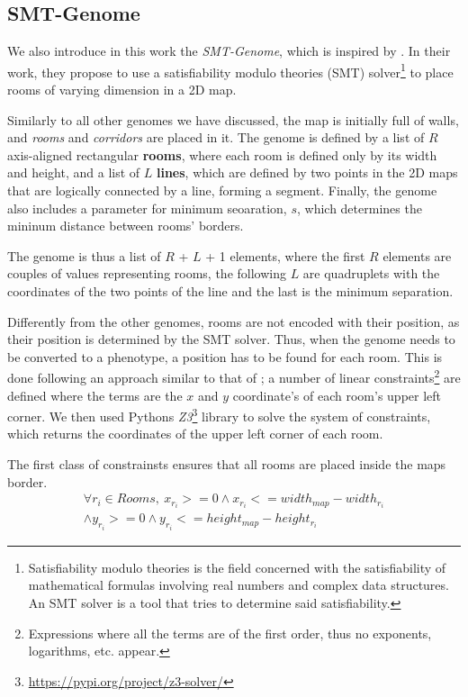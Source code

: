 \documentclass{Configuration_Files/PoliMi3i_thesis}
\begin{document}
\subsection{SMT-Genome}
\label{subsec:smt_genome}

We also introduce in this work the \textit{SMT-Genome}, which is inspired by \citet{whitehead_spatial_2020}. In their work, they propose to use a satisfiability modulo theories (SMT) solver\footnote{Satisfiability modulo theories is the field concerned with the satisfiability of mathematical formulas involving real numbers and complex data structures. An SMT solver is a tool that tries to determine said satisfiability.} to place rooms of varying dimension in a 2D map. 

Similarly to all other genomes we have discussed, the map is initially full of walls, and \textit{rooms} and \textit{corridors} are placed in it.
The genome is defined by a list of $R$ axis-aligned rectangular \textbf{rooms}, where each room is defined only by its width and height, and a list of $L$ \textbf{lines}, which are defined by two points in the 2D maps that are logically connected by a line, forming a segment. Finally, the genome also includes a parameter for minimum seoaration, $s$, which determines the mininum distance between rooms' borders. 

The genome is thus a list of $R$ + $L$ + 1 elements, where the first $R$ elements are couples of values representing rooms, the following $L$ are quadruplets with the coordinates of the two points of the line and the last is the minimum separation.

Differently from the other genomes, rooms are not encoded with their position, as their position is determined by the SMT solver. Thus, when the genome needs to be converted to a phenotype, a position has to be found for each room. This is done following an approach similar to that of \citet{whitehead_spatial_2020}; a number of linear constraints\footnote{Expressions where all the terms are of the first order, thus no exponents, logarithms, etc. appear.} are defined where the terms are the $x$ and $y$ coordinate's of each room's upper left corner. We then used Pythons \textit{Z3}\footnote{\url{https://pypi.org/project/z3-solver/}} library to solve the system of constraints, which returns the coordinates of the upper left corner of each room.

The first class of constrainsts ensures that all rooms are placed inside the maps border. 
\begin{equation}
    \begin{split}
            \forall r_i \in Rooms,\: x_{r_i} >= 0 \land x_{r_i} <= width_{map} - width_{r_i} \\ \land y_{r_i} >= 0 \land y_{r_i} <= height_{map} - height_{r_i}
    \end{split}
\end{equation}
\end{document}
